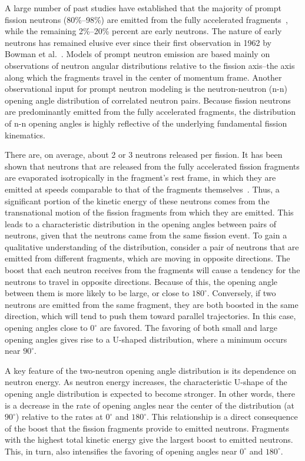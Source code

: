 A large number of past studies have established that the majority of prompt fission neutrons (80\%--98\%) are emitted from the fully accelerated fragments~\cite{Scission2005}, while the remaining 2\%--20\% percent are early neutrons.
The nature of early neutrons has remained elusive ever since their first observation in 1962 by Bowman et al.~\cite{Bowman}.
Models of prompt neutron emission are based mainly on observations of neutron angular distributions relative to the fission axis--the axis along which the fragments travel in the center of momentum frame.
Another observational input for prompt neutron modeling is the neutron-neutron (n-n) opening angle distribution of correlated neutron pairs.
Because fission neutrons are predominantly emitted from the fully accelerated fragments, the distribution of n-n opening angles is highly reflective of the underlying fundamental fission kinematics.

There are, on average, about 2 or 3 neutrons released per fission.
It has been shown that neutrons that are released from the fully accelerated fission fragments are evaporated isotropically in the fragment's rest frame, in which they are emitted at speeds comparable to that of the fragments themselves~\cite{fragmentRestFrame}.
Thus, a significant portion of the kinetic energy of these neutrons comes from the transnational motion of the fission fragments from which they are emitted.
This leads to a characteristic distribution in the opening angles between pairs of neutrons, given that the neutrons came from the same fission event.
To gain a qualitative understanding of the distribution, consider a pair of neutrons that are emitted from different fragments, which are moving in opposite directions.
The boost that each neutron receives from the fragments will cause a tendency for the neutrons to travel in opposite directions.
Because of this, the opening angle between them is more likely to be large, or close to $180^{\circ}$.
Conversely, if two neutrons are emitted from the same fragment, they are both boosted in the same direction, which will tend to push them toward parallel trajectories.
In this case, opening angles close to $0^{\circ}$ are favored.
The favoring of both small and large opening angles gives rise to a U-shaped distribution, where a minimum occurs near $90^{\circ}$.

A key feature of the two-neutron opening angle distribution is its dependence on neutron energy.
As neutron energy increases, the characteristic U-shape of the opening angle distribution is expected to become stronger.
In other words, there is a decrease in the rate of opening angles near the center of the distribution (at $90^{\circ}$) relative to the rates at $0^{\circ}$ and $180^{\circ}$.
This relationship is a direct consequence of the boost that the fission fragments provide to emitted neutrons.
Fragments with the highest total kinetic energy give the largest boost to emitted neutrons.
This, in turn, also intensifies the favoring of opening angles near $0^{\circ}$ and $180^{\circ}$.

